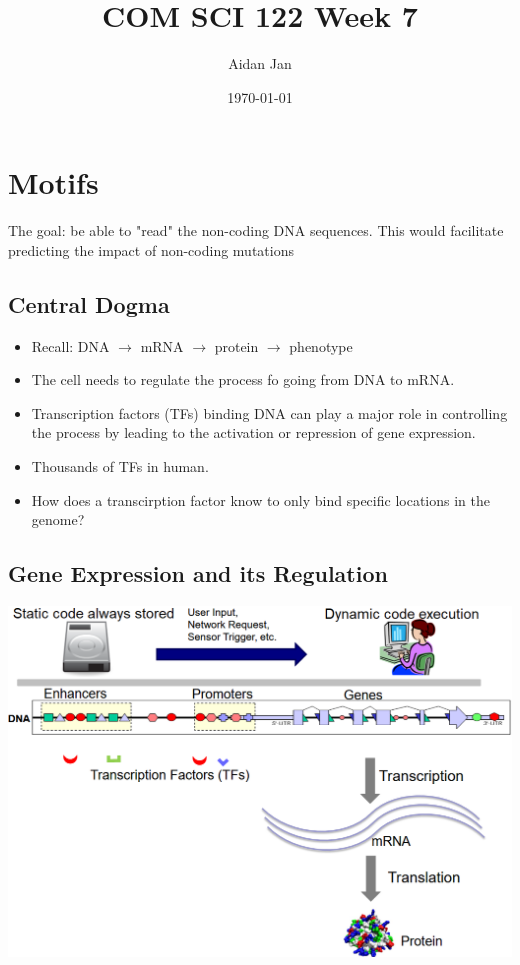 \documentclass[10pt]{article}
\title{COM SCI 122 Week 7}
\author{Aidan Jan}
\date{\today}
\begin{document}
\maketitle

\section*{Motifs}
The goal: be able to "read" the non-coding DNA sequences.  This would facilitate predicting the impact of non-coding mutations
\subsection*{Central Dogma}
\begin{itemize}
    \item Recall: DNA $\rightarrow$ mRNA $\rightarrow$ protein $\rightarrow$ phenotype
    \item The cell needs to regulate the process fo going from DNA to mRNA.
    \item Transcription factors (TFs) binding DNA can play a major role in controlling the process by leading to the activation or repression of gene expression.
    \item Thousands of TFs in human.
    \item How does a transcirption factor know to only bind specific locations in the genome?
\end{itemize}

\subsection*{Gene Expression and its Regulation}
\begin{center}
    \includegraphics*[width=\textwidth]{W7_1.png}
\end{center}
\end{document}
